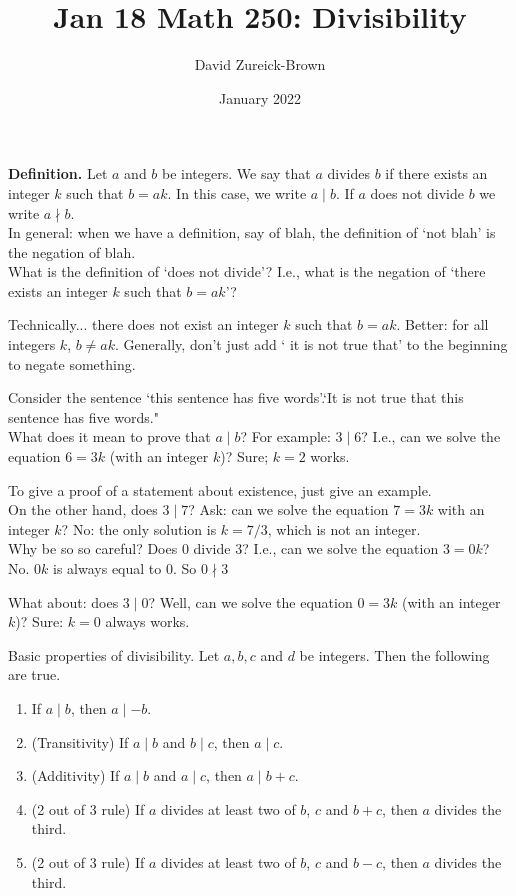 \documentclass{article}
\title{Jan 18 Math 250: Divisibility}
\author{David Zureick-Brown}
\date{January 2022}
\begin{document}
\maketitle

\textbf{Definition.} Let $a$ and $b$ be integers. We say that $a$ divides $b$ if there exists an integer $k$ such that $b =ak$. In this case, we write $a \mid b$. If $a$ does not divide $b$ we write $a \nmid b$.
\\

In general: when we have a definition, say of blah, the definition of `not blah' is the negation of blah. 
\\

What is the definition of `does not divide'? I.e., what is the negation of `there exists an integer $k$ such that $b =ak$'?

Technically... there does not exist an integer $k$ such that $b = ak$. Better: for all integers $k$, $b \not = ak$. Generally, don't just add ` it is not true that' to the beginning to negate something. 

Consider the sentence `this sentence has five words'.`It is not true that this sentence has five words."
\\

What does it mean to prove that $a \mid b$? For example: $3 \mid 6$? I.e., can we solve the equation $6 = 3k$ (with an integer $k$)? Sure; $k = 2$ works.

To give a proof of a statement about existence, just give an example. 
\\

On the other hand, does $3 \mid 7$? Ask: can we solve the equation $7 = 3k$ with an integer $k$? No: the only solution is $k = 7/3$, which is not an integer.
\\

Why be so so careful? Does $0$ divide 3? I.e., can we solve the equation $3 = 0k$? No. $0k$ is always equal to 0. So $0 \nmid 3$

What about: does $3 \mid 0$? Well, can we solve the equation $0 = 3k$ (with an integer $k$)? Sure: $k = 0$ always works.
\newpage

Basic properties of divisibility. Let $a,b,c$ and $d$ be integers. Then the following are true. \begin{enumerate}
    \item If $a \mid b$, then $a \mid -b$.
    \item (Transitivity) If $a \mid b$ and $b \mid c$, then $a \mid c$. 
    \item (Additivity) If $a \mid b$ and $a \mid c$, then $a \mid b + c$.
    \item (2 out of 3 rule) If $a$ divides at least two of $b$, $c$ and $b + c$, then $a$ divides the third.
   \item (2 out of 3 rule) If $a$ divides at least two of $b$, $c$ and $b - c$, then $a$ divides the third.    
\end{enumerate}
\end{document}
